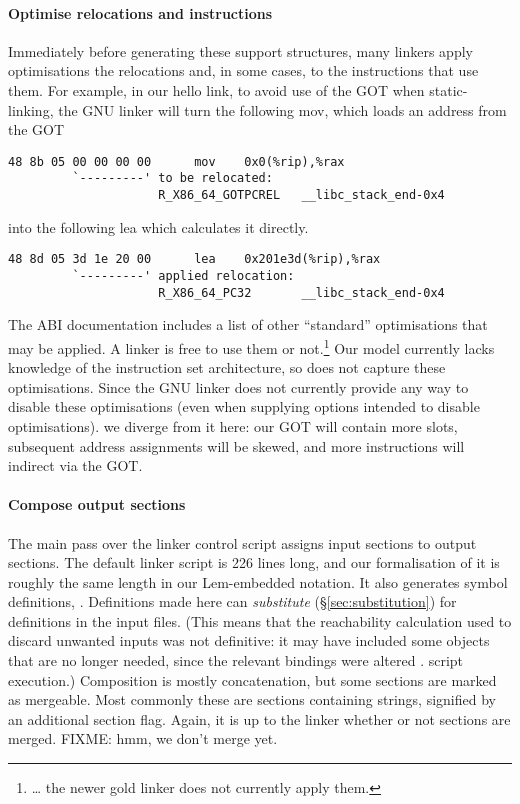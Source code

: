 \paragraph{Optimise relocations and instructions} 
Immediately before generating these support structures, 
many linkers apply optimisations the relocations and, in some cases,
to the instructions that use them.
For example, in our \textsf{hello} link, 
to avoid use of the GOT when static-linking, the GNU linker will turn 
the following \textsf{mov}, which loads an address from the GOT

\begin{lstlisting}[basicstyle=\footnotesize\ttfamily,columns=fixed,language=plain]
48 8b 05 00 00 00 00      mov    0x0(%rip),%rax
         `---------' to be relocated: 
                     R_X86_64_GOTPCREL   __libc_stack_end-0x4
\end{lstlisting}

into the following \textsf{lea} which calculates it directly.

\begin{lstlisting}[basicstyle=\footnotesize\ttfamily,columns=fixed,language=plain]
48 8d 05 3d 1e 20 00      lea    0x201e3d(%rip),%rax
         `---------' applied relocation:
                     R_X86_64_PC32       __libc_stack_end-0x4
\end{lstlisting}

The ABI documentation includes a list of other ``standard'' optimisations that may be applied. 
A linker is free to use them or not.\footnote{\ldots{} the newer \textsf{gold} linker 
does not currently apply them.}
Our model currently lacks knowledge of the instruction set architecture, so does not capture these optimisations.
Since the GNU linker does not currently provide any way to disable these optimisations
(even when supplying options intended to disable optimisations).
we diverge from it here: our GOT will contain more slots,
subsequent address assignments will be skewed,
and more instructions will indirect via the GOT.

\paragraph{Compose output sections} The main pass over the linker control script
assigns input sections to output sections.
The default linker script is 226 lines long,
and our formalisation of it is roughly the same length in our Lem-embedded notation.
It also generates symbol definitions, .
Definitions made here can \emph{substitute} (\S\ref{sec:substitution}) for definitions 
in the input files. (This means that the reachability calculation
used to discard unwanted inputs was not definitive: it may have included
some objects that are no longer needed, since the relevant bindings were altered .
script execution.)
Composition is mostly concatenation, but some sections are marked as mergeable.
Most commonly these are sections containing strings, signified by an additional section flag.
Again, it is up to the linker whether or not sections are merged.
FIXME: hmm, we don't merge yet.

